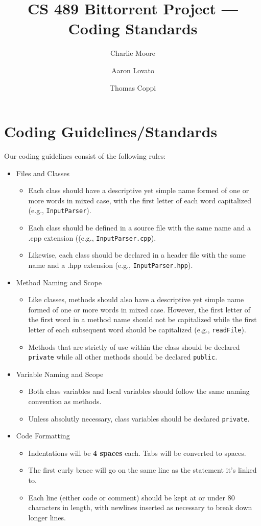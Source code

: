 \documentclass[11pt]{article}
\author{Charlie Moore \and Aaron Lovato \and Thomas Coppi}
\title{CS 489 Bittorrent Project --- Coding Standards}
\begin{document}
\section*{Coding Guidelines/Standards}
Our coding guidelines consist of the following rules:
\begin{itemize}
\item Files and Classes
\begin{itemize}
\item Each class should have a descriptive yet simple name formed of one or more words in mixed case, with the first letter of each word capitalized (e.g., \texttt{InputParser}).
\item Each class should be defined in a source file with the same name and a .cpp extension ((e.g., \texttt{InputParser.cpp}).
\item Likewise, each class should be declared in a header file with the same name and a .hpp extension (e.g., \texttt{InputParser.hpp}).
\end{itemize}
\item Method Naming and Scope
\begin{itemize}
\item Like classes, methods should also have a descriptive yet simple name formed of one or more words in mixed case. However, the first letter of the first word in a method name should not be capitalized while the first letter of each subsequent word should be capitalized (e.g., \texttt{readFile}).
\item Methods that are strictly of use within the class should be declared \texttt{private} while all other methods should be declared \texttt{public}.
\end{itemize}
\item Variable Naming and Scope
\begin{itemize}
\item Both class variables and local variables should follow the same naming convention as methods.
\item Unless absolutly necessary, class variables should be declared \texttt{private}.
\end{itemize}
\item Code Formatting
\begin{itemize}
\item Indentations will be \textbf{4 spaces} each.  Tabs will be converted to
  spaces.
\item The first curly brace will go on the same line as the statement it's
  linked to.
\item Each line (either code or comment)  should be kept at or under 80 characters in length, with newlines inserted as necessary to break down longer lines.


\end{itemize}
\end{itemize}
\end{document}
